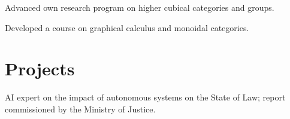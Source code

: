 \documentclass[a4paper]{deedy-resume} %
\begin{document}
\begin{minipage}[t]{0.66\textwidth}
\sectionspace %


\begin{tightitemize}
\item Advanced own research program on higher cubical categories and groups.
\item Developed a course on graphical calculus and monoidal categories.

\end{tightitemize}

\section{Projects}


\begin{tightitemize}
\item AI expert on the impact of autonomous systems on the State of Law; report commissioned by the Ministry of Justice.
\end{tightitemize}

\sectionspace %


\end{minipage} %










\end{document}
